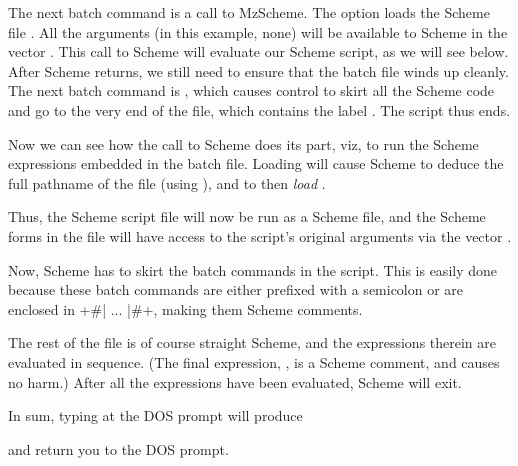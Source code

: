 The next batch command is a call to MzScheme.  The
 option loads the Scheme file .
All the arguments (in this example, none) will be
available to Scheme in the vector .  This call
to Scheme will evaluate our Scheme script, as we will
see below.  After Scheme returns, we still need to
ensure that the batch file winds up cleanly.  The next
batch command is , which causes
control to skirt all the Scheme code and go to the very
end of the file, which contains the label
.   The script thus ends.

Now we can see how the call to Scheme does its part,
viz, to run the Scheme expressions embedded in the
batch file.  Loading  will cause Scheme
to deduce the full pathname of the file 
(using ), and to then {\em
load}
.  

Thus, the Scheme script file will now be run as a
Scheme file, and the Scheme forms in the file will have
access to the script's original arguments via the
vector .

Now, Scheme has to skirt the batch commands in the
script.  This is easily done because these batch
commands are either prefixed with a semicolon or are
enclosed in \p+#| ... |#+, making them Scheme comments.

The rest of the file is of course straight Scheme, and
the expressions therein are evaluated in sequence.  (The
final expression, , is a Scheme comment, and
causes no harm.)  After all the expressions have been
evaluated, Scheme will exit.

In sum, typing  at the DOS prompt will produce


\n and return you to the DOS prompt.
